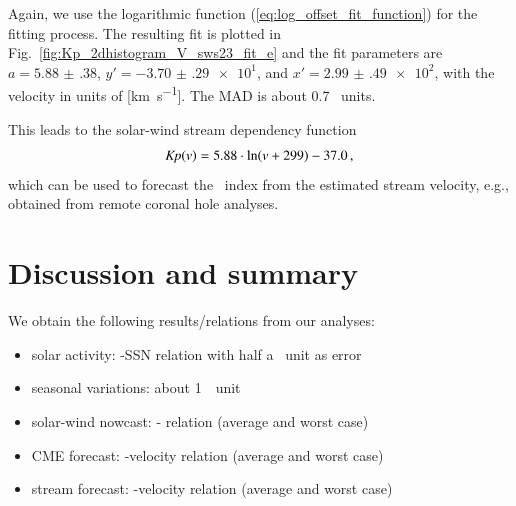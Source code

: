 Again, we use the logarithmic function (\ref{eq:log_offset_fit_function}) for the fitting process. The resulting fit is plotted in Fig.~\ref{fig:Kp_2dhistogram_V_sws23_fit_e} and the fit parameters are $a = \num{5.88(38)}$, $y' = \num{-3.70(29)e1}$, and $x' = \num{2.99(49)e2}$, with the velocity in units of [\si{\km\per\s}]. The MAD is about 0.7~\Kp{} units.
\begin{figure}
\end{figure}
This leads to the solar-wind stream dependency function
\begin{align}
	\textit{Kp}(v) = 5.88 \cdot \ln(v + 299) - 37.0	\,,	\label{eq:kpvsv_sws23_dependency_function}
\end{align}
which can be used to forecast the \Kp{}~index from the estimated stream velocity, e.g., obtained from remote coronal hole analyses.


\section{Discussion and summary}
We obtain the following results/relations from our analyses:
\begin{itemize}
	\item solar activity: \Kp{}-SSN relation with half a \Kp{}~unit as error
	\item seasonal variations: about 1~\Kp{}~unit
	\item solar-wind nowcast: \Kp-\vBz{} relation (average and worst case)
	\item CME forecast: \Kp-velocity relation (average and worst case)
	\item stream forecast: \Kp-velocity relation (average and worst case)
\end{itemize}

